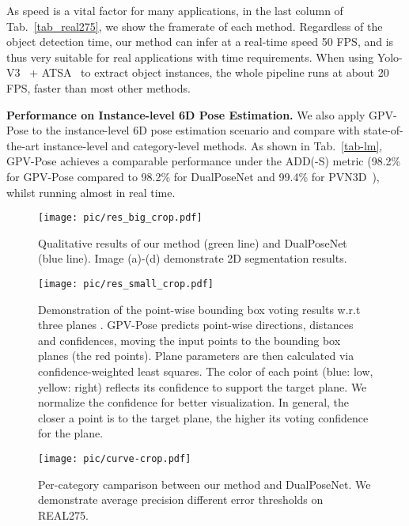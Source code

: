 \documentclass[10pt,twocolumn,letterpaper]{article}
\begin{document}
As speed is a vital factor for many applications, in the last column of Tab.~\ref{tab_real275}, we show the framerate of each method. 
Regardless of the object detection time, our method can infer at a real-time speed 50 FPS, and is thus very suitable for real applications with time requirements.
When using Yolo-V3~\cite{redmon2018yolov3} + ATSA~\cite{atsa} to extract object instances, the whole pipeline runs at about 20 FPS, faster than most other methods.

\textbf{Performance on Instance-level 6D Pose Estimation.}
We also apply GPV-Pose to the instance-level 6D pose estimation scenario and compare with state-of-the-art instance-level and category-level methods.
As shown in Tab.~\ref{tab-lm}, GPV-Pose achieves a comparable performance under the ADD(-S) metric (98.2\% for GPV-Pose compared to 98.2\% for DualPoseNet and 99.4\% for PVN3D~\cite{pvn3d}), whilst running almost in real time.

\begin{figure*}[t]
  \centering
  \texttt{[image: pic/res\_big\_crop.pdf]}
  \caption{Qualitative results of our method (green line) and DualPoseNet (blue line). 
  Image (a)-(d) demonstrate 2D segmentation results.
  }
  \vspace{-0.5cm}
  \label{res_big}
\end{figure*}

\begin{figure}[t]
  \centering
  \texttt{[image: pic/res\_small\_crop.pdf]}
  \caption{Demonstration of the point-wise bounding box voting results w.r.t three planes .
  GPV-Pose predicts point-wise directions, distances and confidences, moving the input points to the bounding box planes (the red points). Plane parameters are then calculated via confidence-weighted least squares.
  The color of each point (blue: low, yellow: right) reflects its confidence to support the target plane.
We normalize the confidence for better visualization.
  In general, the closer a point is to the target plane, the higher its voting confidence for the plane.
  }
  \label{res_small}
\end{figure}


\begin{figure}[t]
  \centering
  \texttt{[image: pic/curve-crop.pdf]}
  \caption{Per-category camparison between our method and DualPoseNet.
  We demonstrate average precision \vs different error thresholds on REAL275. 
  }
  \vspace{-0.3cm}
  \label{PDC_line}
\end{figure}
\end{document}
